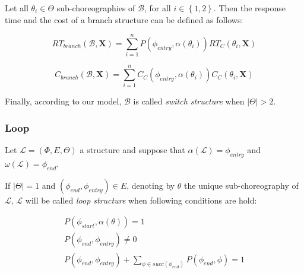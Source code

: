 \documentclass[12pt,a4paper]{report}
\theoremstyle{definition}
\begin{document}
Let all $\theta_i \in \Theta$ sub-choreographies of $\mathcal{B}$, for all $i \in \left\lbrace 1,2 \right\rbrace $. Then the response time and the cost of a branch structure can be defined as follows:

\begin{equation}
	RT_{branch}(\mathcal{B}, \textbf{X}) = \sum_{i = 1}^n P(\phi_{entry}, \alpha(\theta_i)) RT_C(\theta_i, \textbf{X})
\end{equation}

\begin{equation}
	C_{branch}(\mathcal{B}, \textbf{X}) = \sum_{i = 1}^n C_C(\phi_{entry}, \alpha(\theta_i)) C_C(\theta_i, \textbf{X})
\end{equation}

Finally, according to our model, $\mathcal{B}$ is called \textit{switch structure} when $|\Theta| > 2$.

\subsubsection{Loop}

Let $\mathcal{L} = (\Phi,E,\Theta)$ a structure and suppose that $\alpha(\mathcal{L}) = \phi_{entry}$ and $\omega(\mathcal{L}) = \phi_{end}$. 

If $|\Theta| = 1$ and $(\phi_{end}, \phi_{entry}) \in E$, denoting by $\theta$ the unique sub-choreography of $\mathcal{L}$, $\mathcal{L}$ will be called \textit{loop structure} when following conditions are hold:

\begin{eqnarray}
	P(\phi_{start}, \alpha(\theta)) = 1 \\
	P(\phi_{end}, \phi_{entry}) \neq 0 \\
	P(\phi_{end}, \phi_{entry}) + \sum_{\phi \in succ(\phi_{end})} P(\phi_{end}, \phi) = 1
\end{eqnarray}
\end{document}
